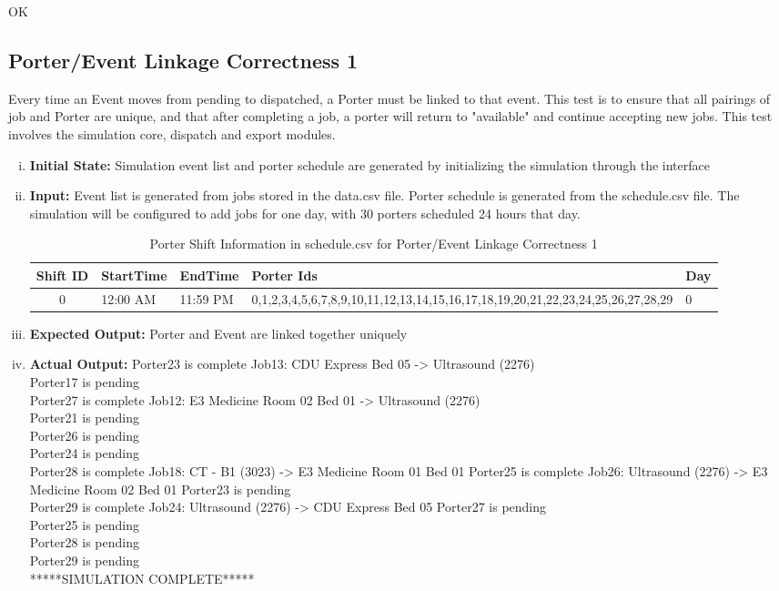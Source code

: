 \documentclass[paper=letter, fontsize=10pt]{scrartcl}
\numberwithin{equation}{section}		%
\numberwithin{figure}{section}			%
\numberwithin{table}{section}				%
\begin{document}
\begin{enumerate}[(i)]
\begin{enumerate}[(i)]
OK
\end{enumerate}

\subsection{Porter/Event Linkage Correctness 1}
Every time an Event moves from pending to dispatched, a Porter must be linked to that event. This test is to ensure that all pairings of job and Porter are unique, and that after completing a job, a porter will return to "available" and continue accepting new jobs. This test involves the simulation core, dispatch and export modules.
\begin{enumerate}[(i)]
	\item \textbf{Initial State:} Simulation event list and porter schedule are generated by initializing the simulation through the interface
	\item \textbf{Input:} Event list is generated from jobs stored in the data.csv file. Porter schedule is generated from the schedule.csv file. The simulation will be configured to add jobs for one day, with 30 porters scheduled 24 hours that day.
	\begin{table}
	\caption{Porter Shift Information in schedule.csv for Porter/Event Linkage Correctness 1}
	\begin{center}
    	\begin{tabular}{| c | l | l | l | l |}
    		\hline
        	Shift ID & StartTime & EndTime & Porter Ids & Day \\ \hline
  			0 & 12:00 AM & 11:59 PM & 0,1,2,3,4,5,6,7,8,9,10,11,12,13,14,15,16,17,18,19,20,21,22,23,24,25,26,27,28,29 & 0 \\ \hline
    	\end{tabular}
	\end{center}
	\end{table}
	\item \textbf{Expected Output:} Porter and Event are linked together uniquely
	\item \textbf{Actual Output:} 
Porter23 is complete Job13: CDU Express Bed 05 -> Ultrasound (2276)\\
Porter17 is pending\\
Porter27 is complete Job12: E3 Medicine Room 02 Bed 01 -> Ultrasound (2276)\\
Porter21 is pending\\
Porter26 is pending\\
Porter24 is pending\\
Porter28 is complete Job18: CT - B1 (3023) -> E3 Medicine Room 01 Bed 01
Porter25 is complete Job26: Ultrasound (2276) -> E3 Medicine Room 02 Bed 01
Porter23 is pending\\
Porter29 is complete Job24: Ultrasound (2276) -> CDU Express Bed 05
Porter27 is pending\\
Porter25 is pending\\
Porter28 is pending\\
Porter29 is pending\\
*****SIMULATION COMPLETE*****\\
\end{enumerate}


\end{enumerate}
\end{document}
